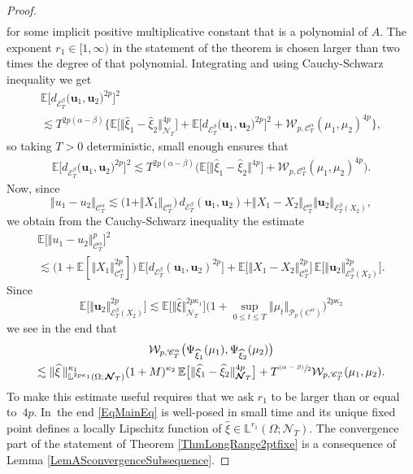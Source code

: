 \documentclass[10pt]{amsart}
\newcommand{\psfrac}[2]{\sfrac{(#1)}{#2}}
\theoremstyle{definition}
\newcommand\bbE{\mathbb{E}}
\newcommand{\mcE}{\mathcal{E}}
\newcommand{\mcN}{\mathcal{N}}
\newcommand{\mcP}{\mathcal{P}}
\newcommand\mcW{\mathcal W}
\newcommand{\bbL}{\mathbb{L}}
\newcommand{\bsu}{\boldsymbol{u}}
\newcommand{\scrC}{\ensuremath{\mathscr{C}}}
\newcommand{\dab}{\mcE^\beta_T}
\newcommand{\norme}[1]{\Vert #1 \Vert}
\begin{document}
\begin{proof}
\begin{equation*}
\begin{split}
\end{split} \end{equation*}
for some implicit positive multiplicative constant that is a polynomial of $A$. The exponent $r_1\in[1,\infty)$ in the statement of the theorem is chosen larger than two times the degree of that polynomial. Integrating and using Cauchy-Schwarz inequality we get
\begin{multline*}
\bbE\bigl[d_{\mcE^\beta_T}\bigl(\bsu_1, \bsu_2\bigr)^{2p} \bigr]^2 \\
\lesssim T^{2p(\alpha-\beta)} \bigl\{ \bbE\bigl[ \big\Vert \widehat\xi_1 - \widehat\xi_2\big\Vert_{{{\boldsymbol{\mcN}}_T}}^{4p}\bigr] + \bbE\bigl[ d_{\mcE^\beta_T}\bigl(\bsu_1, \bsu_2\bigr)^{2p} \bigr]^2 + \mcW_{p,\scrC^\alpha_T}(\mu_1,\mu_2)^{4p} \bigr\},
\end{multline*}
so taking $T>0$ deterministic, small enough ensures that
\begin{align*}
\bbE\bigl[ d_{\mcE_T^\beta}\bigl(\bsu_1, \bsu_2\bigr)^{2p} \bigr]^2 \lesssim T^{2p(\alpha-\beta)} \bigl(\bbE\bigl[ \Vert \widehat\xi_1 - \widehat\xi_2\Vert^{4p}\bigr] + \mcW_{p,\scrC^\alpha_T}(\mu_1,\mu_2)^{4p}\bigr).
\end{align*}
Now, since
\[
\norme{u_1-u_2}_{\scrC^\alpha_T} \lesssim \bigl(1+\norme{X_1}_{\scrC_T^\alpha}\bigr) \, d_{\dab}(\bsu_1,\bsu_2) + \norme{X_1-X_2}_{\scrC^\alpha_T} \norme{\bsu_2}_{\dab(X_2)},
\]
we obtain from the Cauchy-Schwarz inequality the estimate
\begin{multline*}
\bbE\bigl[\norme{u_1 - u_2}_{\scrC^\alpha_T}^p\bigr]^2 \\
\lesssim \bigl(1+\bbE[\norme{X_1}_{\scrC_T^\alpha}^{2p}]\bigr) \, \bbE\bigl[d_{\dab}(\bsu_1,\bsu_2)^{2p}\bigr] + \bbE\bigl[\norme{X_1-X_2}_{\scrC^\alpha_T}^{2p}\bigr] \, \bbE\bigl[\norme{\bsu_2}_{\dab(X_2)}^{2p}\bigr].
\end{multline*}
Since
\[
\bbE\bigl[\norme{\bsu_2}_{\dab(X_2)}^{2p}\bigr] \lesssim \bbE\bigl[ \Vert\widehat{\xi}\Vert_{{\boldsymbol{\mcN}}_T}^{2p\kappa_1}\bigr] \bigl(1+\sup_{0\leq t\leq T} \Vert \mu_t\Vert_{\mcP_p(C^\alpha)}\bigr)^{2p\kappa_2}
\]
we see in the end that
\begin{multline*}
\mcW_{p,\scrC^\alpha_T}\bigl( \Psi_{\widehat\xi_1}(\mu_1), \Psi_{\widehat\xi_2}(\mu_2) \bigr) \\
\lesssim \Vert \widehat{\xi}\,\Vert_{\bbL^{2p\kappa_1}(\Omega;\,{\boldsymbol{\mcN}}_T)}^{\kappa_1} (1+M)^{\kappa_2} \, \bbE\bigl[ \Vert \widehat\xi_1 - \widehat\xi_2\Vert_{{{\boldsymbol{\mcN}}_T}}^{4p}\bigr] + T^{\psfrac{\alpha-\beta}{2}} \mcW_{p,\scrC^\alpha_T}(\mu_1,\mu_2).
\end{multline*}
To make this estimate useful requires that we ask $r_1$ to be larger than or equal to~$4p$. In~the end \eqref{EqMainEq} is well-posed in small time and its unique fixed point defines a locally Lipschitz function of $\widehat{\xi}\in \bbL^{r_1}(\Omega; {\boldsymbol{\mcN}}_T)$. The convergence part of the statement of Theorem \ref{ThmLongRange2ptfixe} is a consequence of Lemma \ref{LemASconvergenceSubsequence}.
\end{proof}
\end{document}
